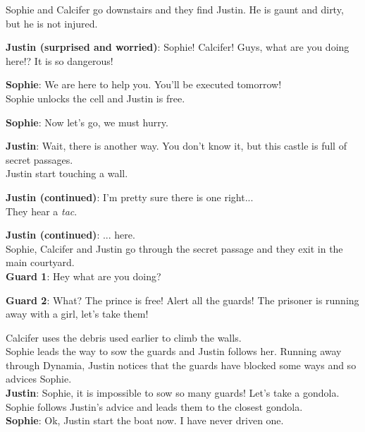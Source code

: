 
Sophie and Calcifer go downstairs and they find Justin. He is gaunt and dirty, but he is not injured.

\textbf{Justin (surprised and worried)}: Sophie! Calcifer! Guys, what are you doing here!? It is so dangerous!

\textbf{Sophie}: We are here to help you. You'll be executed tomorrow!\\

Sophie unlocks the cell and Justin is free.

\textbf{Sophie}: Now let's go, we must hurry.

\textbf{Justin}: Wait, there is another way. You don't know it, but this castle is full of secret passages. \\

Justin start touching a wall.

\textbf{Justin (continued)}: I'm pretty sure there is one right... \\

They hear a \textit{tac}.

\textbf{Justin (continued)}: ... here. \\

\noindent Sophie, Calcifer and Justin go through the secret passage and they exit in the main courtyard.\\




\textbf{Guard 1}: Hey what are you doing?

\textbf{Guard 2}: What? The prince is free! Alert all the guards! The prisoner is running away with a girl, let's take them!

\noindent Calcifer uses the debris used earlier to climb the walls.\\

\noindent Sophie leads the way to sow the guards and Justin follows her. Running away through Dynamia, Justin notices that the guards have blocked some ways and so advices Sophie.\\

\textbf{Justin}: Sophie, it is impossible to sow so many guards! Let's take a gondola. \\

\noindent Sophie follows Justin's advice and leads them to the closest gondola.\\

\textbf{Sophie}: Ok, Justin start the boat now. I have never driven one.

